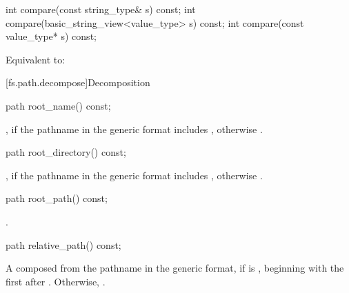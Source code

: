 %
\begin{itemdecl}
int compare(const string_type& s) const;
int compare(basic_string_view<value_type> s) const;
int compare(const value_type* s) const;
\end{itemdecl}

\begin{itemdescr}
\pnum
\effects
Equivalent to: 
\end{itemdescr}

[fs.path.decompose]{Decomposition}

%
\begin{itemdecl}
path root_name() const;
\end{itemdecl}

\begin{itemdescr}
\pnum
\returns
{}, if the pathname in the generic format
includes , otherwise .
\end{itemdescr}

%
\begin{itemdecl}
path root_directory() const;
\end{itemdecl}

\begin{itemdescr}
\pnum
\returns
{}, if the pathname in the generic format
includes , otherwise .
\end{itemdescr}

%
\begin{itemdecl}
path root_path() const;
\end{itemdecl}

\begin{itemdescr}
\pnum
\returns
{}.
\end{itemdescr}

%
\begin{itemdecl}
path relative_path() const;
\end{itemdecl}

\begin{itemdescr}
\pnum
\returns
A  composed from the pathname in the generic format,
if  is , beginning
with the first  after . Otherwise, .
\end{itemdescr}


